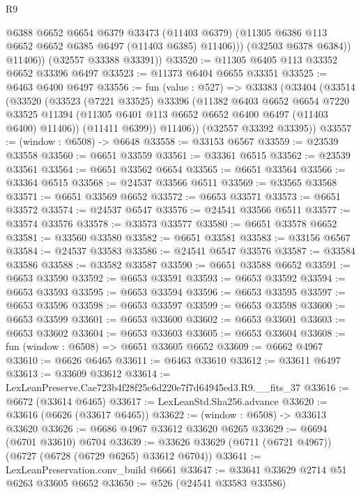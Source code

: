 \begin{lexlean}{R9}
\begin{coremodule}
                @6388
                @6652
                @6654
                @6379
                @33473
                (@11403 @6379)
                (@11305 @6386 @113 @6652 @6652 @6385 @6497 (@11403 @6385) @11406)))
            (@32503 @6378 @6384))
          @11406))
      (@32557 @33388 @33391))
@33520 := @11305 @6405 @113 @33352 @6652 @33396 @6497
@33523 := @11373 @6404 @6655 @33351
@33525 := @6463 @6400 @6497
@33556 := fun (value : @527) =>
  @33383
    (@33404
      (@33514
        (@33520
          (@33523
            (@7221 @33525)
            @33396
            (@11382
              @6403
              @6652
              @6654
              @7220
              @33525
              @11394
              (@11305 @6401 @113 @6652 @6652 @6400 @6497 (@11403 @6400) @11406))
            (@11411 @6399))
          @11406))
      (@32557 @33392 @33395))
@33557 := (window : @6508) -> @6648
@33558 := @33153 @6567
@33559 := @23539 @33558
@33560 := @6651 @33559
@33561 := @33361 @6515
@33562 := @23539 @33561
@33564 := @6651 @33562 @6654
@33565 := @6651 @33564
@33566 := @33364 @6515
@33568 := @24537 @33566 @6511
@33569 := @33565 @33568
@33571 := @6651 @33569 @6652
@33572 := @6653 @33571
@33573 := @6651 @33572
@33574 := @24537 @6547
@33576 := @24541 @33566 @6511
@33577 := @33574 @33576
@33578 := @33573 @33577
@33580 := @6651 @33578 @6652
@33581 := @33560 @33580
@33582 := @6651 @33581
@33583 := @33156 @6567
@33584 := @24537 @33583
@33586 := @24541 @6547 @33576
@33587 := @33584 @33586
@33588 := @33582 @33587
@33590 := @6651 @33588 @6652
@33591 := @6653 @33590
@33592 := @6653 @33591
@33593 := @6653 @33592
@33594 := @6653 @33593
@33595 := @6653 @33594
@33596 := @6653 @33595
@33597 := @6653 @33596
@33598 := @6653 @33597
@33599 := @6653 @33598
@33600 := @6653 @33599
@33601 := @6653 @33600
@33602 := @6653 @33601
@33603 := @6653 @33602
@33604 := @6653 @33603
@33605 := @6653 @33604
@33608 := fun (window : @6508) => @6651 @33605 @6652
@33609 := @6662 @4967
@33610 := @6626 @6465
@33611 := @6463 @33610
@33612 := @33611 @6497
@33613 := @33609 @33612
@33614 := LexLeanPreserve.Cae723b4f28f25c6d220e7f7d64945ed3.R9.__fits_37
@33616 := @6672 (@33614 @6465)
@33617 := LexLeanStd.Sha256.advance
@33620 := @33616 (@6626 (@33617 @6465))
@33622 := (window : @6508) -> @33613 @33620
@33626 := @6686 @4967 @33612 @33620 @6265
@33629 := @6694 (@6701 @33610) @6704
@33639 := @33626 @33629 (@6711 (@6721 @4967)) (@6727 (@6728 (@6729 @6265) @33612 @6704))
@33641 := LexLeanPreservation.conv_build @6661
@33647 := @33641 @33629 @2714 @51 @6263 @33605 @6652
@33650 := @526 (@24541 @33583 @33586)

\end{coremodule}
\end{lexlean}
